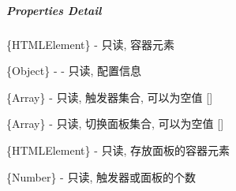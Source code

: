 \documentclass[letterpaper,10pt,english]{sphinxmanual}
\begin{document}
\subparagraph{Properties Detail}
\label{api/component/switchable/switchable:properties-detail}

\begin{fulllineitems}
\label{api/component/switchable/switchable:Switchable.container}
\{HTMLElement\} - 只读, 容器元素

\end{fulllineitems}



\begin{fulllineitems}
\label{api/component/switchable/switchable:Switchable.config}
\{Object\} - - 只读, 配置信息

\end{fulllineitems}



\begin{fulllineitems}
\{Array\} - 只读, 触发器集合, 可以为空值 {[}{]}

\end{fulllineitems}



\begin{fulllineitems}
\{Array\} - 只读, 切换面板集合,  可以为空值 {[}{]}

\end{fulllineitems}



\begin{fulllineitems}
\label{api/component/switchable/switchable:Switchable.content}
\{HTMLElement\} - 只读, 存放面板的容器元素

\end{fulllineitems}



\begin{fulllineitems}
\label{api/component/switchable/switchable:Switchable.length}
\{Number\} - 只读, 触发器或面板的个数

\end{fulllineitems}
\end{document}
